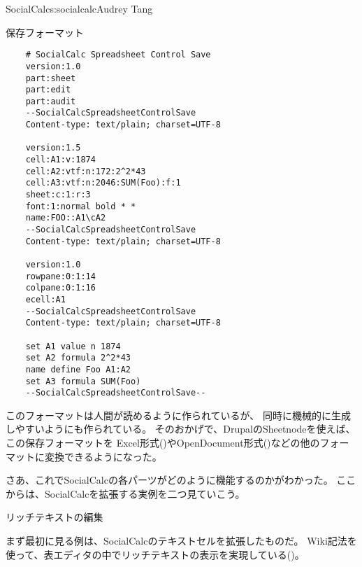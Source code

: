 \begin{aosachapter}{SocialCalc}{s:socialcalc}{Audrey Tang}
\begin{aosasect1}{保存フォーマット}
\begin{verbatim}
    # SocialCalc Spreadsheet Control Save
    version:1.0
    part:sheet
    part:edit
    part:audit
    --SocialCalcSpreadsheetControlSave
    Content-type: text/plain; charset=UTF-8

    version:1.5
    cell:A1:v:1874
    cell:A2:vtf:n:172:2^2*43
    cell:A3:vtf:n:2046:SUM(Foo):f:1
    sheet:c:1:r:3
    font:1:normal bold * *
    name:FOO::A1\cA2
    --SocialCalcSpreadsheetControlSave
    Content-type: text/plain; charset=UTF-8

    version:1.0
    rowpane:0:1:14
    colpane:0:1:16
    ecell:A1
    --SocialCalcSpreadsheetControlSave
    Content-type: text/plain; charset=UTF-8

    set A1 value n 1874
    set A2 formula 2^2*43
    name define Foo A1:A2
    set A3 formula SUM(Foo)
    --SocialCalcSpreadsheetControlSave--
\end{verbatim}

\noindent
このフォーマットは人間が読めるように作られているが、
同時に機械的に生成しやすいようにも作られている。
そのおかげで、DrupalのSheetnodeを使えば、この保存フォーマットを
Excel形式()やOpenDocument形式()などの他のフォーマットに変換できるようになった。

さあ、これでSocialCalcの各パーツがどのように機能するのかがわかった。
ここからは、SocialCalcを拡張する実例を二つ見ていこう。

\end{aosasect1}

\begin{aosasect1}{リッチテキストの編集}

まず最初に見る例は、SocialCalcのテキストセルを拡張したものだ。
Wiki記法を使って、表エディタの中でリッチテキストの表示を実現している()。



\end{aosasect1}
\end{aosachapter}
